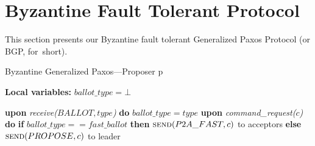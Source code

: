\documentclass[algorithms,article,accept,moreauthors,pdftex,10pt,a4paper]{Definitions/mdpi}
\begin{document}
%

\section{Byzantine Fault Tolerant Protocol}
\label{sec:bft}
%


This section presents our Byzantine fault tolerant Generalized Paxos
Protocol (or BGP, for~short). 

\begin{algorithm}[H]
\caption{Byzantine Generalized Paxos---Proposer p}
\label{BFT-Prop}
\textbf{Local variables:} $ballot\_type = \bot$
\begin{algorithmic}[1] 
\State \textbf{upon} \textit{receive($BALLOT, type$)} \textbf{do} 
\State \hspace{\algorithmicindent} $ballot\_type = type$
\State
\State \textbf{upon} \textit{command\_request($c$)} \textbf{do} \hspace{\algorithmicindent}\hspace{\algorithmicindent}\hspace{\algorithmicindent}\hspace{\algorithmicindent}
\State \hspace{\algorithmicindent} \textbf{if} $ballot\_type == fast\_ballot$ \textbf{then}
\State \hspace{\algorithmicindent}\hspace{\algorithmicindent} $\Call{send}{P2A\_FAST, c}$ to acceptors
\State \hspace{\algorithmicindent} \textbf{else} 
\State \hspace{\algorithmicindent}\hspace{\algorithmicindent} $\Call{send}{PROPOSE, c}$ to leader
\end{algorithmic}
\end{algorithm}
\end{document}
